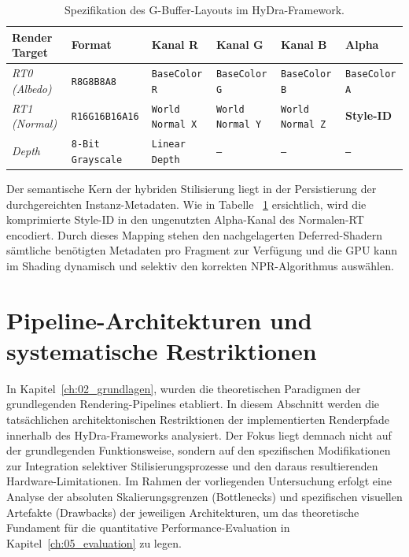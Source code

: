 \begin{table}[htbp]
    \centering
    \small
    \renewcommand{\arraystretch}{1.3}
    \begin{tabularx}{\textwidth}{l | l X X X X}
        \hline
        \textbf{Render Target} & \textbf{Format} & \textbf{Kanal R} & \textbf{Kanal G} & \textbf{Kanal B} &
        \textbf{Alpha} \\
        \hline
        \textit{RT0 (Albedo)}  & \texttt{R8G8B8A8}        & \texttt{BaseColor R}    & \texttt{BaseColor G}
        & \texttt{BaseColor B}    & \texttt{BaseColor A}    \\
        \textit{RT1 (Normal)}  & \texttt{R16G16B16A16}    & \texttt{World Normal X} & \texttt{World Normal Y}
        & \texttt{World Normal Z} & \textbf{Style-ID}       \\
        \textit{Depth}         & \texttt{8-Bit Grayscale} & \texttt{Linear Depth}   & \texttt{--}
        & \texttt{--}             & \texttt{--}             \\
        \hline
    \end{tabularx}
    \caption{Spezifikation des G-Buffer-Layouts im \ac{HyDra}-Framework.}
    \label{tab:gbuffer_layout}
\end{table}

Der semantische Kern der hybriden Stilisierung liegt in der Persistierung der durchgereichten Instanz-Metadaten.
Wie in Tabelle ~\ref{tab:gbuffer_layout} ersichtlich, wird die komprimierte Style-ID in den ungenutzten Alpha-Kanal des
Normalen-\ac{RT} encodiert.
Durch dieses Mapping stehen den nachgelagerten Deferred-Shadern sämtliche benötigten Metadaten pro Fragment zur
Verfügung und die \ac{GPU} kann im Shading dynamisch und selektiv den korrekten \ac{NPR}-Algorithmus auswählen.


\section{Pipeline-Architekturen und systematische Restriktionen}
\label{sec:0402_pipelines_and_restrictions}

In Kapitel~\ref{ch:02_grundlagen}, wurden die theoretischen Paradigmen der grundlegenden Rendering-Pipelines
etabliert.
In diesem Abschnitt werden die tatsächlichen architektonischen Restriktionen der implementierten Renderpfade innerhalb
des \ac{HyDra}-Frameworks analysiert.
Der Fokus liegt demnach nicht auf der grundlegenden Funktionsweise, sondern auf den spezifischen Modifikationen zur
Integration selektiver Stilisierungsprozesse und den daraus resultierenden Hardware-Limitationen.
Im Rahmen der vorliegenden Untersuchung erfolgt eine Analyse der absoluten Skalierungsgrenzen (Bottlenecks) und
spezifischen visuellen Artefakte (Drawbacks) der jeweiligen Architekturen, um das theoretische Fundament für die
quantitative Performance-Evaluation in Kapitel~\ref{ch:05_evaluation} zu legen.

